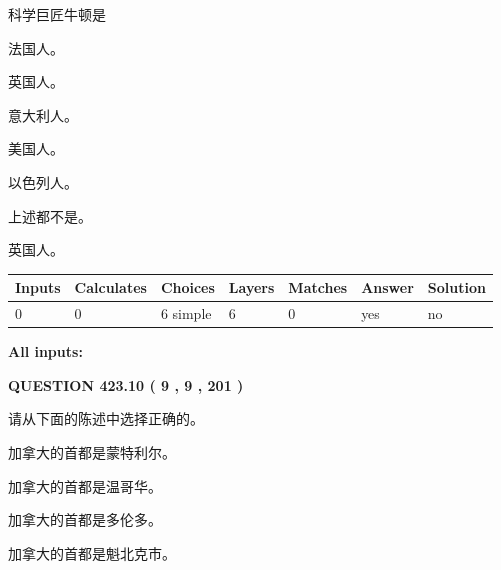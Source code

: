 \documentclass{ctexart}
\begin{document}
  
科学巨匠牛顿是
 
 
法国人。
 
 
英国人。
 
 
意大利人。
 
 
美国人。
 
 
以色列人。
 
 
 上述都不是。
 
 
\noindent{}
 
 
英国人。
 
 
\noindent{}
 
 
   
   
   
   
\noindent\begin{tabular}{|l|l|l|l|l|l|l|}
 \hline
Inputs & Calculates & Choices & Layers & Matches & Answer & Solution \\ \hline
 0  & 
 0  & 
 6
  simple  
  & 
 6  & 
 0  & 
  yes & 
  no 
  \\ \hline
 \end{tabular}
   
   
   
   
\noindent{}
   
   
   
   
\noindent\vspace{0.1in}\hspace{-0.08in} {\textbf{\Large{All inputs: }}}
   
   
  
\vspace{0.2in}
  
{\textbf{\Large{QUESTION
423.10 
 ( 9 , 9 , 201 )
}}}
  
  
请从下面的陈述中选择正确的。
 
 
加拿大的首都是蒙特利尔。
 
 
加拿大的首都是温哥华。
 
 
加拿大的首都是多伦多。
 
 
加拿大的首都是魁北克市。
 
\end{document}
